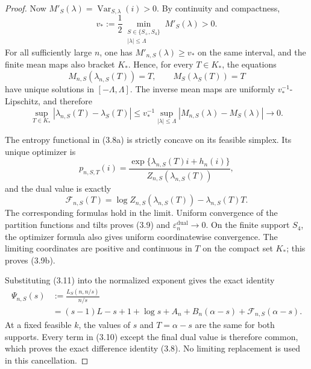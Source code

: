 \begin{proof}
Now
$M'_S(\lambda)=\operatorname{Var}_{S,\lambda}(i)>0$. By continuity and
compactness,
\[
  v_*:=\frac12
  \min_{\substack{S\in\{S_+,S_4\}\\|\lambda|\le\Lambda}}
  M'_S(\lambda)>0.
\]
For all sufficiently large $n$, one has
$M'_{n,S}(\lambda)\ge v_*$ on the same interval, and the finite mean maps
also bracket $K_*$. Hence, for every $T\in K_*$, the equations
\[
  M_{n,S}(\lambda_{n,S}(T))=T,
  \qquad
  M_S(\lambda_S(T))=T
\]
have unique solutions in $[-\Lambda,\Lambda]$. The inverse mean maps are
uniformly $v_*^{-1}$-Lipschitz, and therefore
\[
  \sup_{T\in K_*}
  |\lambda_{n,S}(T)-\lambda_S(T)|
  \le
  v_*^{-1}\sup_{|\lambda|\le\Lambda}
  |M_{n,S}(\lambda)-M_S(\lambda)|
  \longrightarrow0.
\]

The entropy functional in (3.8a) is strictly concave on its feasible
simplex. Its unique optimizer is
\[
  p_{n,S,T}(i)
  =\frac{
    \exp\{\lambda_{n,S}(T)i+h_n(i)\}
  }{Z_{n,S}(\lambda_{n,S}(T))},
\]
and the dual value is exactly
\[
  \mathcal F_{n,S}(T)
  =\log Z_{n,S}(\lambda_{n,S}(T))
   -\lambda_{n,S}(T)T.
\]
The corresponding formulas hold in the limit. Uniform convergence of the
partition functions and tilts proves (3.9) and
$\varepsilon_n^{\mathrm{dual}}\to0$. On the finite support $S_4$, the optimizer
formula also gives uniform coordinatewise convergence. The limiting
coordinates are positive and continuous in $T$ on the compact set $K_*$;
this proves (3.9b).

Substituting (3.11) into the normalized exponent gives the exact identity
\begin{equation*}
\begin{split}
  \Psi_{n,S}(s)
  &:=\frac{L_S(n,n/s)}{n/s}\\
  &=(s-1)L-s+1+\log s
    +A_n+B_n(\alpha-s)
    +\mathcal F_{n,S}(\alpha-s).
\end{split}
  \tag{3.10}
\end{equation*}
At a fixed feasible $k$, the values of $s$ and $T=\alpha-s$ are the same for
both supports. Every term in (3.10) except the final dual value is therefore
common, which proves the exact difference identity (3.8). No limiting
replacement is used in this cancellation.


\end{proof}
